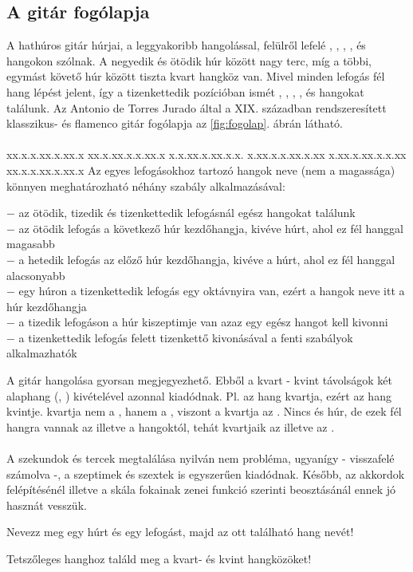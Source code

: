 \subsection{A gitár fogólapja}
\label{sec:gitarfogolap}
A hathúros gitár húrjai, a leggyakoribb hangolással, felülről lefelé , , , ,  és  hangokon szólnak. A negyedik és ötödik húr között nagy terc, míg a többi, egymást követő húr között tiszta kvart hangköz van. Mivel minden lefogás fél hang lépést jelent, így a tizenkettedik pozícióban ismét , , , ,  és  hangokat találunk. Az Antonio de Torres Jurado által a XIX. században rendszeresített klasszikus- és flamenco gitár fogólapja az \ref{fig:fogolap}. ábrán látható.\\\\
          {xx.x.x.xx.x.xx.x%
           xx.x.xx.x.x.xx.x%
           x.x.xx.x.xx.x.x.%
           x.xx.x.x.xx.x.xx%
           x.xx.x.xx.x.x.xx%
           xx.x.x.xx.x.xx.x}
Az egyes lefogásokhoz tartozó hangok neve (nem a magassága) könnyen meghatározható néhány szabály alkalmazásával:
\begin{pitemize}
$-$ az ötödik, tizedik és tizenkettedik lefogásnál egész hangokat találunk  \\
$-$ az ötödik lefogás a következő húr kezdőhangja, kivéve  húrt, ahol ez fél hanggal magasabb  \\
$-$ a hetedik lefogás az előző húr kezdőhangja, kivéve a  húrt, ahol ez fél hanggal alacsonyabb \\
$-$ egy húron a tizenkettedik lefogás egy oktávnyira van, ezért a hangok neve itt a húr kezdőhangja \\
$-$ a tizedik lefogáson a húr kiszeptimje van azaz egy egész hangot kell kivonni \\
$-$ a tizenkettedik lefogás felett tizenkettő kivonásával a fenti szabályok alkalmazhatók \\
\end{pitemize}
A gitár hangolása gyorsan megjegyezhető. Ebből a kvart - kvint távolságok két alaphang (, ) kivételével azonnal kiadódnak. Pl.  az  hang kvartja, ezért  az  hang kvintje.  kvartja nem a , hanem a , viszont a  kvartja az . Nincs  és  húr, de ezek fél hangra vannak az  illetve a  hangoktól, tehát kvartjaik az  illetve az . \\\\
A szekundok és tercek megtalálása nyilván nem probléma, ugyanígy - visszafelé számolva -, a szeptimek és szextek is egyszerűen kiadódnak. Később, az akkordok felépítésénél illetve a skála fokainak zenei funkció szerinti beosztásánál ennek jó hasznát vesszük.
\begin{practices}
\item Nevezz meg egy húrt és egy lefogást, majd az ott található hang nevét!
\item Tetszőleges hanghoz találd meg a kvart- és kvint hangközöket!
\end{practices}
